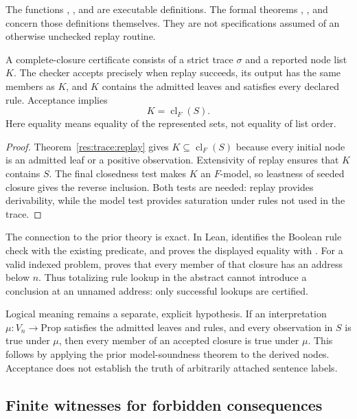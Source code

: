 The functions , , and  are executable definitions. The formal theorems , , and  concern those definitions themselves. They are not specifications assumed of an otherwise unchecked replay routine.

\begin{theorem}
\label{res:trace:least}
A complete-closure certificate consists of a strict trace $\sigma$ and a reported node list $K$. The checker accepts precisely when replay succeeds, its output has the same members as $K$, and $K$ contains the admitted leaves and satisfies every declared rule. Acceptance implies
\[
 \boxed{K=\operatorname{cl}_F(S).}
\]
Here equality means equality of the represented sets, not equality of list order.
\end{theorem}
\begin{proof}
Theorem~\ref{res:trace:replay} gives $K\subseteq\operatorname{cl}_F(S)$ because every initial node is an admitted leaf or a positive observation. Extensivity of replay ensures that $K$ contains $S$. The final closedness test makes $K$ an $F$-model, so leastness of seeded closure gives the reverse inclusion. Both tests are needed: replay provides derivability, while the model test provides saturation under rules not used in the trace.
\end{proof}

The connection to the prior theory is exact. In Lean,  identifies the Boolean rule check with the existing  predicate, and  proves the displayed equality with . For a valid indexed problem,  proves that every member of that closure has an address below $n$. Thus totalizing rule lookup in the abstract  cannot introduce a conclusion at an unnamed address: only successful lookups are certified.

Logical meaning remains a separate, explicit hypothesis. If an interpretation $\mu:V_n\to\mathrm{Prop}$ satisfies the admitted leaves and rules, and every observation in $S$ is true under $\mu$, then every member of an accepted closure is true under $\mu$. This follows by applying the prior model-soundness theorem to the derived nodes. Acceptance does not establish the truth of arbitrarily attached sentence labels.

\subsection{Finite witnesses for forbidden consequences}
\label{sec:trace-obstruction}

